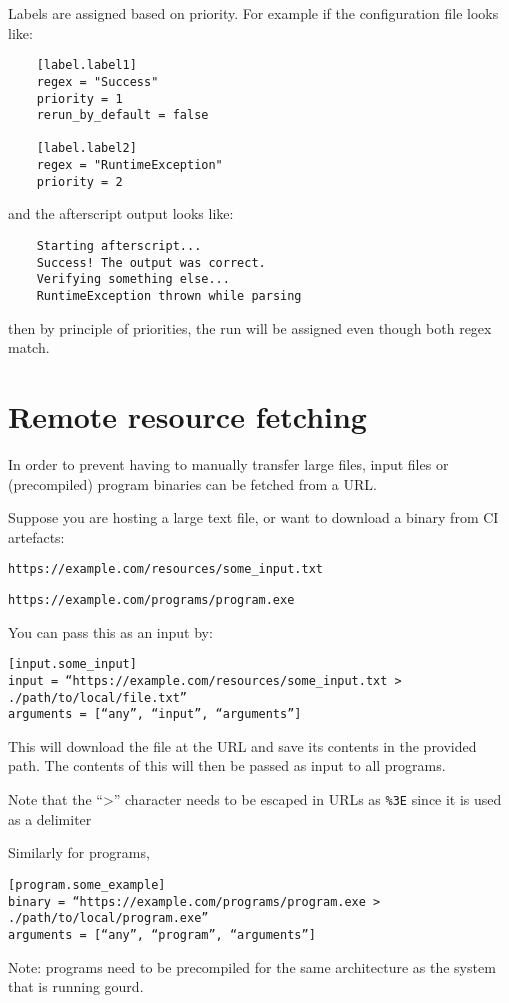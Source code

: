 \documentclass[a4paper,english]{article}
\begin{document}
\begin{adjustwidth}{18pt}{0pt}
  Labels are assigned based on priority.
  For example if the configuration file looks like:
  \begin{verbatim}
    [label.label1]
    regex = "Success"
    priority = 1
    rerun_by_default = false

    [label.label2]
    regex = "RuntimeException"
    priority = 2
  \end{verbatim}

  and the afterscript output looks like:

  \begin{verbatim}
    Starting afterscript...
    Success! The output was correct.
    Verifying something else...
    RuntimeException thrown while parsing
  \end{verbatim}

  then by principle of priorities, the run will be assigned  even though both regex match.

  \section{Remote resource fetching}
    In order to prevent having to manually transfer large files, input files or (precompiled) program binaries can be fetched from a URL.

    Suppose you are hosting a large text file, or want to download a binary from CI artefacts:
    
    \texttt{https://example.com/resources/some\_input.txt}
   
     \texttt{https://example.com/programs/program.exe}

    You can pass this as an input by:
\begin{verbatim}
[input.some_input]
input = “https://example.com/resources/some_input.txt > ./path/to/local/file.txt”
arguments = [“any”, “input”, “arguments”]
\end{verbatim}

    This will download the file at the URL and save its contents in the provided path.
    The contents of this will then be passed as input to all programs.

    Note that the “>” character needs to be escaped in URLs as \texttt{\%3E} since it is used as a delimiter

    Similarly for programs,
\begin{verbatim}
[program.some_example]
binary = “https://example.com/programs/program.exe > ./path/to/local/program.exe”
arguments = [“any”, “program”, “arguments”]
\end{verbatim}
    Note: programs need to be precompiled for the same architecture as the system that is running gourd.


\end{adjustwidth}
\end{document}

